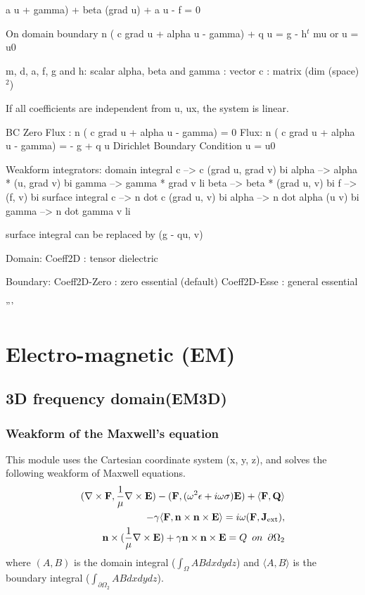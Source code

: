 \documentclass[11pt,a4paper,draft]{report}
\begin{document}
  a u + gamma) 
              + beta (grad u) + a u - f = 0

  On domain boundary
     n ( c grad u + alpha u - gamma) + q u = g - h$^t$ mu
       or 
     u = u0  

    m, d, a, f, g and h: scalar
    alpha, beta and gamma : vector
    c  : matrix (dim (space) $^2$)

    If all coefficients are independent from u, ux,
    the system is linear.

    BC
     Zero Flux : 
        n ( c grad u + alpha u - gamma) = 0
     Flux: 
        n ( c grad u + alpha u - gamma) = - g + q u
     Dirichlet Boundary Condition
        u = u0

  Weakform integrators:
    domain integral
       c     -->  c (grad u, grad v)     bi
       alpha -->  alpha * (u, grad v)    bi
       gamma -->  gamma * grad v         li
       beta  -->  beta * (grad u, v)     bi
       f     -->  (f, v)                 bi
    surface integral
       c     -->   n dot c (grad u, v)   bi
       alpha -->   n dot alpha  (u v)    bi
       gamma -->   n dot gamma   v       li
 
    surface integral can be replaced by (g - qu, v)
        
  Domain:   
     Coeff2D          : tensor dielectric

  Boundary:
     Coeff2D-Zero     : zero essential (default)
     Coeff2D-Esse     : general essential

'''
\section{Electro-magnetic (EM)}
\subsection{3D frequency domain(EM3D)}
\subsubsection{Weakform of the Maxwell's equation}
This module uses the Cartesian coordinate system (x, y, z), and solves the following weakform of Maxwell equations. 
 \begin{align}
(\nabla \times \mathbf{F},  \frac{1}{\mu}\nabla  \times  \mathbf{E})
 - (\mathbf{F},  (\omega^2 \epsilon+ i \omega \sigma)  \mathbf{E}) 
 +  \langle \mathbf{F},  \mathbf{Q} \rangle 
 \notag \\
 - \gamma \langle  \mathbf{F}, \mathbf{n} \times \mathbf{n} \times  \mathbf{E}\rangle = i \omega (\mathbf{F}, \mathbf{J}_{\rm ext} ) ,
\label{em3d_weak} \\
 \mathbf{n} \times (\frac{1}{\mu} \nabla \times \mathbf{E}) + \gamma \mathbf{n} \times \mathbf{n} \times  \mathbf{E} = Q\,\,\,on\,\,\,\partial \Omega_{2}
 \end{align}
  where $(A , B)$ is the domain integral ($\int_{\Omega} AB dxdydz$) and $\langle A, B \rangle $ is the boundary integral ($\int_{\partial \Omega_{2}} ABdxdydz$). 
 
\end{document}
